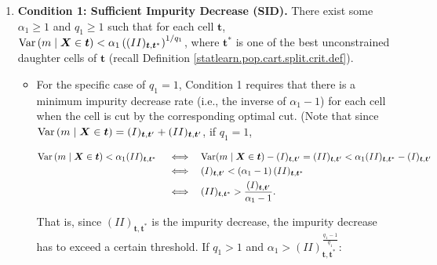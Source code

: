 \begin{enumerate}

\item \textbf{Condition 1: Sufficient Impurity Decrease (SID).} There exist some \(\alpha_1 \geq 1\) and \(q_1 \geq 1\) such that for each cell \(\boldsymbol{t}\), \(\mathrm{Var} \left(m \mid \boldsymbol{X} \in \boldsymbol{t} \right) < \alpha_1 \left( (II)_{\boldsymbol{t}, \boldsymbol{t}^*} \right)^{1/q_1}\), where \(\boldsymbol{t}^*\) is one of the best unconstrained daughter cells of \(\boldsymbol{t}\) (recall Definition \ref{statlearn.pop.cart.split.crit.def}). 



\begin{itemize}

\item For the specific case of \(q_1 =1\), Condition 1 requires that there is a minimum impurity decrease rate (i.e., the inverse of \(\alpha_1 - 1\)) for each cell when the cell is cut by the corresponding optimal cut. (Note that since \(\mathrm{Var} \left(m \mid \boldsymbol{X} \in \boldsymbol{t} \right)  =  (I)_{\boldsymbol{t}, \boldsymbol{t}'}  +(II)_{\boldsymbol{t}, \boldsymbol{t}'}\), if \(q_1 = 1\),

\begin{align*}
\mathrm{Var} \left(m \mid \boldsymbol{X} \in \boldsymbol{t} \right) < \alpha_1  (II)_{\boldsymbol{t}, \boldsymbol{t}^*}  \quad \iff \quad  &  \mathrm{Var}(m \mid \boldsymbol{X} \in \boldsymbol{t}) - (I)_{\boldsymbol{t}, \boldsymbol{t}'} = (II)_{\boldsymbol{t}, \boldsymbol{t}'}  < \alpha_1  (II)_{\boldsymbol{t}, \boldsymbol{t}^*}  - (I)_{\boldsymbol{t}, \boldsymbol{t}'} 
\\  \iff \quad  & (I)_{\boldsymbol{t}, \boldsymbol{t}'}  < \left(\alpha_1 - 1 \right)  (II)_{\boldsymbol{t}, \boldsymbol{t}^*}  
\\  \iff \quad  & (II)_{\boldsymbol{t}, \boldsymbol{t}^*}  > \frac{(I)_{\boldsymbol{t}, \boldsymbol{t}'}}{\alpha_1 - 1}  .
\end{align*}

That is, since \((II)_{\boldsymbol{t}, \boldsymbol{t}^*}\) is the impurity decrease, the impurity decrease has to exceed a certain threshold. If \(q_1 > 1\) and \(\alpha_1 > (II)_{\boldsymbol{t}, \boldsymbol{t}^*}^{\frac{q_1 - 1}{q_1}}\):


\end{itemize}
\end{enumerate}
